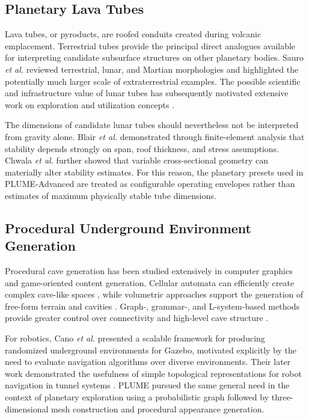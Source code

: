 \documentclass[conference]{IEEEtran}
\begin{document}
\subsection{Planetary Lava Tubes}

Lava tubes, or pyroducts, are roofed conduits created during volcanic emplacement. Terrestrial tubes provide the principal direct analogues available for interpreting candidate subsurface structures on other planetary bodies. Sauro \emph{et al.} \cite{sauro2020} reviewed terrestrial, lunar, and Martian morphologies and highlighted the potentially much larger scale of extraterrestrial examples. The possible scientific and infrastructure value of lunar tubes has subsequently motivated extensive work on exploration and utilization concepts \cite{feng2024,daedalus2021}.

The dimensions of candidate lunar tubes should nevertheless not be interpreted from gravity alone. Blair \emph{et al.} \cite{blair2017} demonstrated through finite-element analysis that stability depends strongly on span, roof thickness, and stress assumptions. Chwala \emph{et al.} \cite{chwala2024} further showed that variable cross-sectional geometry can materially alter stability estimates. For this reason, the planetary presets used in PLUME-Advanced are treated as configurable operating envelopes rather than estimates of maximum physically stable tube dimensions.

\subsection{Procedural Underground Environment Generation}

Procedural cave generation has been studied extensively in computer graphics and game-oriented content generation. Cellular automata can efficiently create complex cave-like spaces \cite{johnson2010}, while volumetric approaches support the generation of free-form terrain and cavities \cite{santamaria2014}. Graph-, grammar-, and L-system-based methods provide greater control over connectivity and high-level cave structure \cite{antoniuk2016,paris2021}.

For robotics, Cano \emph{et al.} \cite{cano_gazebo} presented a scalable framework for producing randomized underground environments for Gazebo, motivated explicitly by the need to evaluate navigation algorithms over diverse environments. Their later work demonstrated the usefulness of simple topological representations for robot navigation in tunnel systems \cite{cano_navigation}. PLUME \cite{plume2025} pursued the same general need in the context of planetary exploration using a probabilistic graph followed by three-dimensional mesh construction and procedural appearance generation.
\end{document}
